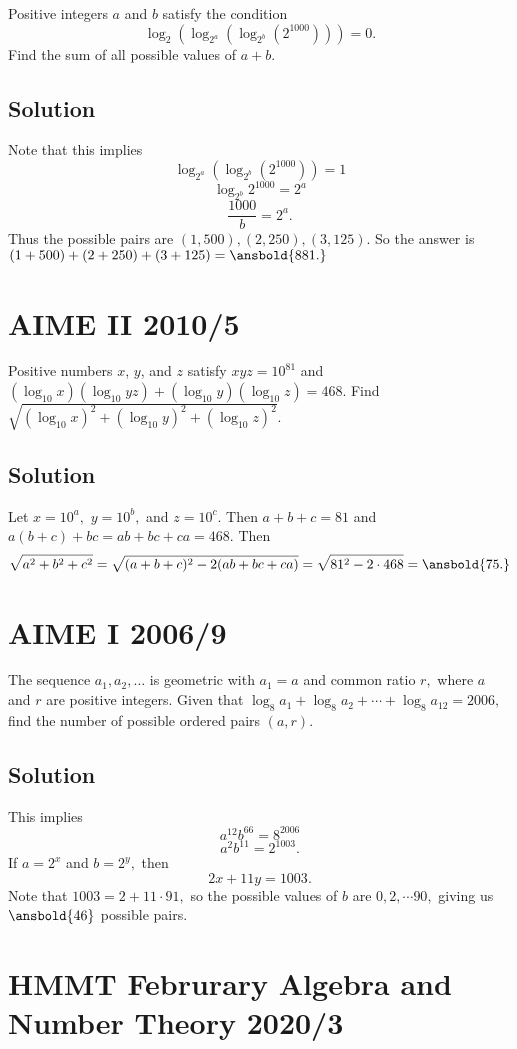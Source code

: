 \documentclass[mast]{lucky}
\begin{document}
Positive integers $a$ and $b$ satisfy the condition \[\log_2(\log_{2^a}(\log_{2^b}(2^{1000}))) = 0.\] Find the sum of all possible values of $a+b$.

\subsection{Solution}

Note that this implies
\[\log_{2^a}(\log_{2^b}(2^{1000}))=1\]
\[\log_{2^b}2^{1000}=2^a\]
\[\frac{1000}{b}=2^a.\]
Thus the possible pairs are $(1,500),(2,250),(3,125).$ So the answer is $(1+500)+(2+250)+(3+125)=\ansbold{881.}$

\pagebreak\section{AIME II 2010/5}

Positive numbers $x$, $y$, and $z$ satisfy $xyz = 10^{81}$ and $(\log_{10}x)(\log_{10} yz) + (\log_{10}y) (\log_{10}z) = 468$. Find $\sqrt {(\log_{10}x)^2 + (\log_{10}y)^2 + (\log_{10}z)^2}$.

\subsection{Solution}

Let $x=10^a,$ $y=10^b,$ and $z=10^c.$ Then $a+b+c=81$ and $a(b+c)+bc=ab+bc+ca=468.$ Then
\[\sqrt{a^2+b^2+c^2}=\sqrt{(a+b+c)^2-2(ab+bc+ca)}=\sqrt{81^2-2\cdot 468}=\ansbold{75.}\]

\pagebreak\section{AIME I 2006/9}

The sequence $a_1, a_2, \ldots$ is geometric with $a_1=a$ and common ratio $r,$ where $a$ and $r$ are positive integers. Given that $\log_8 a_1+\log_8 a_2+\cdots+\log_8 a_{12} = 2006,$ find the number of possible ordered pairs $(a,r).$

\subsection{Solution}

This implies
\[a^{12}b^{66}=8^{2006}\]
\[a^2b^{11}=2^{1003}.\]
If $a=2^x$ and $b=2^y,$ then
\[2x+11y=1003.\]
Note that $1003=2+11\cdot 91,$ so the possible values of $b$ are $0,2,\cdots 90,$ giving us $\ansbold{46}$ possible pairs.

\pagebreak\section{HMMT Februrary Algebra and Number Theory 2020/3}
\end{document}
